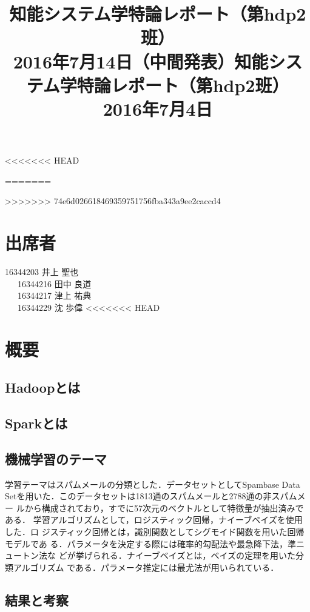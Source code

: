 \documentclass[a4paper,12pt]{jarticle}
\begin{document}
%
<<<<<<< HEAD
\title{\vspace{-30mm}知能システム学特論レポート（第hdp2班）\\ 2016年7月14日（中間発表）}
=======
\title{\vspace{-30mm}知能システム学特論レポート（第hdp2班）\\ 2016年7月4日}
>>>>>>> 74e6d026618469359751756fba343a9ee2caccd4
\date{}
%
%
\maketitle
%
\vspace{-30mm}
%
\section{出席者}
16344203 井上 聖也\\
~~~16344216 田中 良道\\
~~~16344217 津上 祐典\\
~~~16344229 沈 歩偉
<<<<<<< HEAD
\section{概要}

\subsection{Hadoopとは}

\subsection{Sparkとは}

\subsection{機械学習のテーマ}
学習テーマはスパムメールの分類とした．データセットとしてSpambase Data
Setを用いた．このデータセットは1813通のスパムメールと2788通の非スパムメー
ルから構成されており，すでに57次元のベクトルとして特徴量が抽出済みである．
学習アルゴリズムとして，ロジスティック回帰，ナイーブベイズを使用した．ロ
ジスティック回帰とは，識別関数としてシグモイド関数を用いた回帰モデルであ
る．パラメータを決定する際には確率的勾配法や最急降下法，準ニュートン法な
どが挙げられる．ナイーブベイズとは，ベイズの定理を用いた分類アルゴリズム
である．パラメータ推定には最尤法が用いられている．


\subsection{結果と考察}
\end{document}
